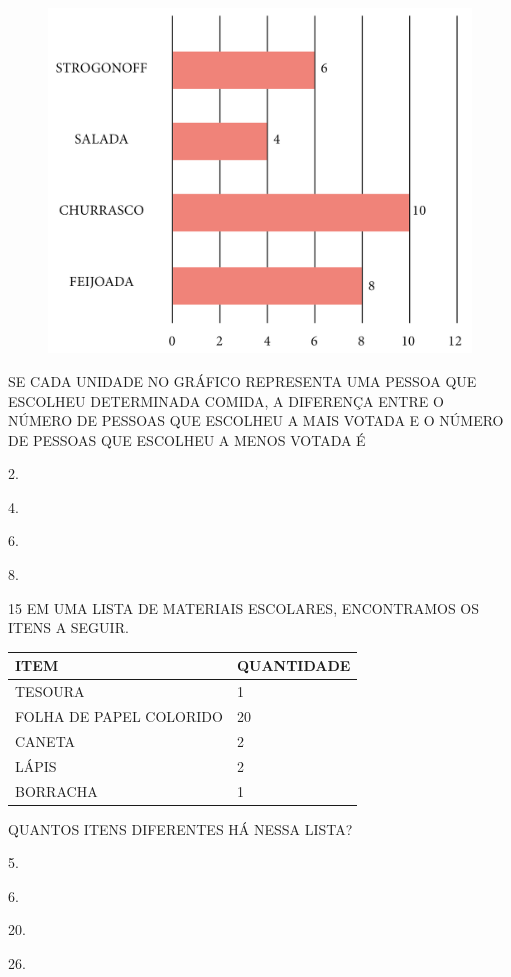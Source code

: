 \begin{figure}[htpb!]
\centering
\includegraphics[width=\textwidth]{./media/SAEB_1ANO_MAT_FIGURA141.png}
\end{figure}

SE CADA UNIDADE NO GRÁFICO REPRESENTA UMA PESSOA QUE ESCOLHEU DETERMINADA COMIDA,
A DIFERENÇA ENTRE O NÚMERO DE PESSOAS QUE ESCOLHEU A MAIS VOTADA E O NÚMERO DE
PESSOAS QUE ESCOLHEU A MENOS VOTADA É

\begin{escolha}[itemsep=0pt]
\item 2.

\item 4.

\item 6.

\item 8.
\end{escolha}


\num{15} EM UMA LISTA DE MATERIAIS ESCOLARES, ENCONTRAMOS OS ITENS A SEGUIR.


\begin{table}[!ht]
    \centering
    \begin{tabular}{|l|l|}
    \hline
        \textbf{ITEM} & \textbf{QUANTIDADE} \\ \hline
        TESOURA & 1 \\ \hline
        FOLHA DE PAPEL COLORIDO & 20 \\ \hline
        CANETA & 2 \\ \hline
        LÁPIS & 2 \\ \hline
        BORRACHA & 1 \\ \hline
    \end{tabular}
\end{table}

QUANTOS ITENS DIFERENTES HÁ NESSA LISTA?

\begin{escolha}[itemsep=0pt]
\item 5.

\item 6.

\item 20.

\item 26.
\end{escolha}